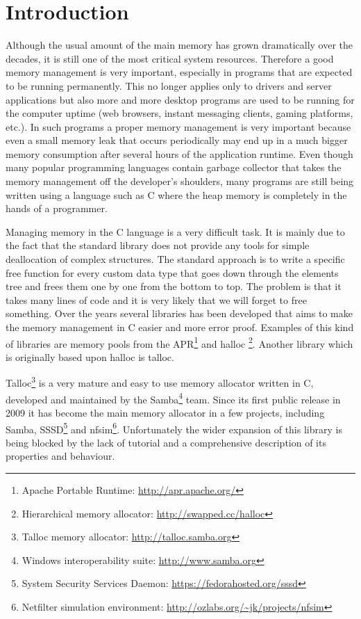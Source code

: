 \chapter{Introduction}

Although the usual amount of the main memory has grown dramatically over the
decades, it is still one of the most critical system resources. Therefore a good
memory management is very important, especially in programs that are expected to
be running permanently. This no longer applies only to drivers and server
applications but also more and more desktop programs are used to be running
for the computer uptime (web browsers, instant messaging clients, gaming
platforms, etc.). In such programs a proper memory management is very important
because even a small memory leak that occurs periodically may end up in a much
bigger memory consumption after several hours of the application runtime. Even
though many popular programming languages contain garbage collector that takes
the memory management off the developer's shoulders, many programs are still
being written using a language such as C where the heap memory is completely
in the hands of a programmer.

Managing memory in the C language is a very difficult task. It is mainly due to
the fact that the standard library does not provide any tools for simple
deallocation of complex structures. The standard approach is to write a
specific free function for every custom data type that goes down through the
elements tree and frees them one by one from the bottom to top. The problem is
that it takes many lines of code and it is very likely that we will forget to
free something. Over the years several libraries has been developed that aims
to make the memory management in C easier and more error proof. Examples of this
kind of libraries are memory pools from the APR\footnote{Apache Portable
Runtime: \url{http://apr.apache.org/}} and halloc \footnote{Hierarchical
memory allocator: \url{http://swapped.cc/halloc}}. Another library which is originally
based upon halloc is talloc.

Talloc\footnote{Talloc memory allocator: \url{http://talloc.samba.org}} is a
very mature and easy to use memory allocator written in C, developed and
maintained by the Samba\footnote{Windows interoperability suite:
\url{http://www.samba.org}} team. Since its first public release in 2009 it has
become the main memory allocator in a few projects, including Samba,
SSSD\footnote{System Security Services Daemon:
\url{https://fedorahosted.org/sssd}} and nfsim\footnote{Netfilter simulation
environment: \url{http://ozlabs.org/~jk/projects/nfsim}}. Unfortunately the
wider expansion of this library is being blocked by the lack of tutorial and a
comprehensive description of its properties and behaviour.

